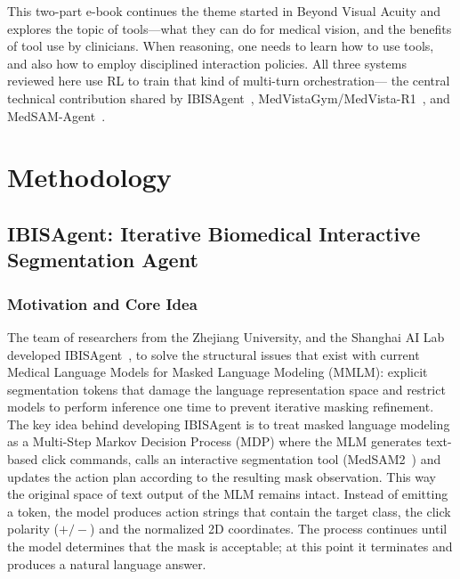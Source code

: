 \documentclass[12pt, a4paper]{article}
\begin{document}
This two-part e-book continues the theme started in Beyond Visual Acuity and explores
the topic of tools---what they can do for medical vision, and the benefits of tool use
by clinicians.
When reasoning, one needs to learn how to use tools, and also how to employ disciplined
interaction policies.
All three systems reviewed here use RL to train that kind of multi-turn orchestration---
the central technical contribution shared by IBISAgent~\cite{ibisagent},
MedVistaGym/MedVista-R1~\cite{medvistagym}, and MedSAM-Agent~\cite{medsam_agent}.

\section{Methodology}
\label{sec:methodology}

\subsection{IBISAgent: Iterative Biomedical Interactive Segmentation Agent}
\label{sec:ibis}

\subsubsection{Motivation and Core Idea}

The team of researchers from the Zhejiang University, and the Shanghai AI Lab developed
IBISAgent~\cite{ibisagent}, to solve the structural issues that exist with current
Medical Language Models for Masked Language Modeling (MMLM): explicit segmentation
tokens that damage the language representation space and restrict models to perform
inference one time to prevent iterative masking refinement.
The key idea behind developing IBISAgent is to treat masked language modeling as a
Multi-Step Markov Decision Process (MDP) where the MLM generates text-based click
commands, calls an interactive segmentation tool (MedSAM2~\cite{medsam2}) and updates
the action plan according to the resulting mask observation.
This way the original space of text output of the MLM remains intact.
Instead of emitting a token, the model produces action strings that contain the target
class, the click polarity ($+/-$) and the normalized 2D coordinates.
The process continues until the model determines that the mask is acceptable; at this
point it terminates and produces a natural language answer.
\end{document}
